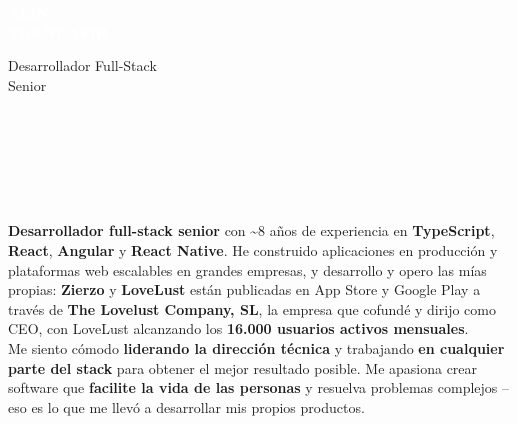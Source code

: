 \documentclass[9pt]{developercv} %
\begin{document}
\newlength{\namewidth}

\begin{minipage}[t]{0.40\textwidth} %
	\vspace{-\baselineskip} %

	\colorbox{cvink}{\parbox{\namewidth}{%
		\HUGE\textcolor{white}{\textbf{\MakeUppercase{Alin}}}\\[2pt]
		\HUGE\textcolor{white}{\textbf{\MakeUppercase{Trandafir}}}}}

	\vspace{6pt} %

	{\huge\raggedright Desarrollador Full-Stack\\Senior\par} %
\end{minipage}
\hfill %
\begin{minipage}[t]{0.56\textwidth} %
	\vspace{-\baselineskip} %

	\\
	\\
	\\
	\\
	\\
\end{minipage}

\vspace{0.5cm} %



\textbf{Desarrollador full-stack senior} con \textasciitilde{}8 años de experiencia en \textbf{TypeScript}, \textbf{React}, \textbf{Angular} y \textbf{React Native}. He construido aplicaciones en producción y plataformas web escalables en grandes empresas, y desarrollo y opero las mías propias: \textbf{Zierzo} y \textbf{LoveLust} están publicadas en App Store y Google Play a través de \textbf{The Lovelust Company, SL}, la empresa que cofundé y dirijo como CEO, con LoveLust alcanzando los \textbf{16.000 usuarios activos mensuales}.
\\
Me siento cómodo \textbf{liderando la dirección técnica} y trabajando \textbf{en cualquier parte del stack} para obtener el mejor resultado posible. Me apasiona crear software que \textbf{facilite la vida de las personas} y resuelva problemas complejos -- eso es lo que me llevó a desarrollar mis propios productos.
\end{document}
